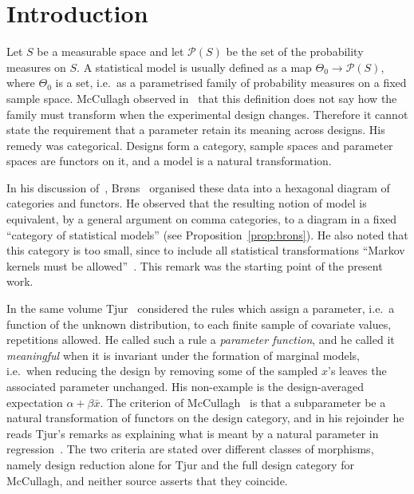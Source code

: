 \documentclass[11pt,a4paper]{article}
\theoremstyle{plain}
\theoremstyle{definition}
\theoremstyle{remark}
\newcommand{\Prb}{\mathcal{P}}
\begin{document}
\setcounter{tocdepth}{2}
\tableofcontents

\section{Introduction}\label{sec:intro}

Let $S$ be a measurable space and let $\Prb(S)$ be the set of the probability
measures on $S$. A statistical model is usually defined as a map
$\Theta_0 \to \Prb(S)$, where $\Theta_0$ is a set, i.e.\ as a parametrised
family of probability measures on a fixed sample space. McCullagh observed
in~\cite{mccullagh_what_2002} that this definition does not say how the family
must transform when the experimental design changes. Therefore it cannot state
the requirement that a parameter retain its meaning across designs. His remedy
was categorical. Designs form a category, sample spaces and parameter spaces
are functors on it, and a model is a natural transformation.

In his discussion of~\cite{mccullagh_what_2002},
Br\o ns~\cite[pp.~1280--1282]{brons_discussion_2002} organised these data into
a hexagonal diagram of categories and functors. He observed that the resulting
notion of model is equivalent, by a general argument on comma categories, to a
diagram in a fixed ``category of statistical models'' (see
Proposition~\ref{prop:brons}). He also noted that this category is too small,
since to include all statistical transformations ``Markov kernels must be
allowed''~\cite[p.~1282]{brons_discussion_2002}. This remark was the starting
point of the present work.

In the same volume Tjur~\cite{tjur_discussion_2002} considered the rules which
assign a parameter, i.e.\ a function of the unknown distribution, to each
finite sample of covariate values, repetitions allowed. He called such a rule
a \emph{parameter function}, and he called it \emph{meaningful} when it is
invariant under the formation of marginal models, i.e.\ when reducing the
design by removing some of the sampled $x$'s leaves the associated parameter
unchanged. His non-example is the design-averaged expectation
$\alpha + \beta\bar x$. The criterion of
McCullagh~\cite[\S4.5]{mccullagh_what_2002} is that a subparameter be a natural
transformation of functors on the design category, and in his rejoinder he
reads Tjur's remarks as explaining what is meant by a natural parameter in
regression~\cite[p.~1304]{mccullagh_what_2002}. The two criteria are stated
over different classes of morphisms, namely design reduction alone for Tjur
and the full design category for McCullagh, and neither source asserts that
they coincide.
\end{document}
